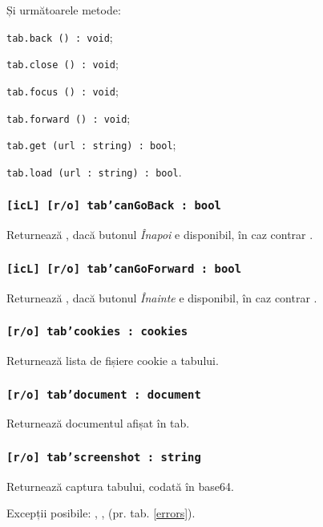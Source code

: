 Și următoarele metode:
\begin{icItems}
	\item \texttt{tab.back () : void};
	\item \texttt{tab.close () : void};
	\item \texttt{tab.focus () : void};
	\item \texttt{tab.forward () : void};
	\item \texttt{tab.get (url : string) : bool};
	\item \texttt{tab.load (url : string) : bool}.
\end{icItems}

\subsubsection{\texttt{[icL] [r/o] tab'canGoBack : bool}}

Returnează \true, dacă butonul \textit{Înapoi} e disponibil, în caz contrar \false.

\subsubsection{\texttt{[icL] [r/o] tab'canGoForward : bool}}

Returnează \true, dacă butonul \textit{Înainte} e disponibil, în caz contrar \false.

\subsubsection{\texttt{[r/o] tab'cookies : cookies}}

Returnează lista de fișiere cookie a tabului.

\subsubsection{\texttt{[r/o] tab'document : document}}

Returnează documentul afișat în tab.

\subsubsection{\texttt{[r/o] tab'screenshot : string}}

Returnează captura tabului, codată în base64.

Excepții posibile: , ,  (pr. tab. \ref{errors}).

